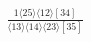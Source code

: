 \documentclass[varwidth, border=5pt]{standalone}
\begin{document}
\begin{my}
$\begin{gathered}
\scriptscriptstyle\frac{1⟨25⟩⟨12⟩[34]}{⟨13⟩⟨14⟩⟨23⟩[35]}
\end{gathered}$
\end{my}
\end{document}
